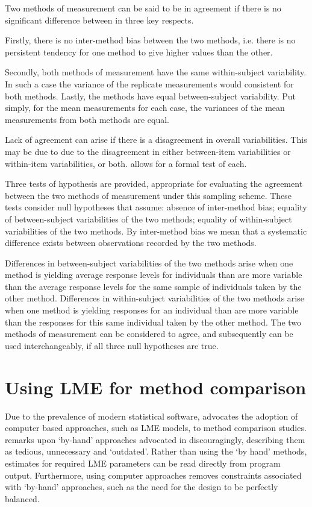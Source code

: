 \documentclass[12pt, a4paper]{report}
\theoremstyle{plain}
\theoremstyle{definition}
\theoremstyle{remark}
\begin{document}
Two methods of measurement can be said to be in agreement if there is no significant difference between in three key respects. 

Firstly, there is no inter-method bias between the two methods, i.e. there is no persistent tendency for one method to give higher values than the other.

Secondly, both methods of measurement have the same  within-subject variability. In such a case the variance of the replicate measurements would consistent for both methods.
Lastly, the methods have equal between-subject variability.  Put simply, for the mean measurements for each case, the variances of the mean measurements from both methods are equal.

Lack of agreement can arise if there is a disagreement in overall variabilities. This may be due to due to the disagreement in either between-item
variabilities or within-item variabilities, or both. \citet{ARoy2009} allows for a formal test of each.

\bigskip

Three tests of hypothesis are provided, appropriate for evaluating the agreement between the two methods of measurement under this sampling scheme. These tests consider null hypotheses that assume: absence of inter-method bias; equality of between-subject variabilities of the two methods; equality of within-subject variabilities of the two methods. By inter-method bias we mean that a systematic difference exists between observations recorded by the two methods. 

Differences in between-subject variabilities of the two methods arise when one method is yielding average response levels for individuals than are more variable than the average response levels for the same sample of individuals taken by the other method.  Differences in within-subject variabilities of the two methods arise when one method is yielding responses for an individual than are more variable than the responses for this same individual taken by the other method. The two methods of measurement can be considered to agree, and subsequently can be used interchangeably, if all three null hypotheses are true.	


\section{Using LME for method comparison}
Due to the prevalence of modern statistical software, \citet{BXC2008} advocates the adoption of computer based approaches, such as LME models, to method comparison studies. \citet{BXC2008} remarks upon `by-hand' approaches advocated in \citet{BA99} discouragingly, describing them as tedious, unnecessary and `outdated'. Rather than using the `by hand' methods, estimates for required LME parameters can be read directly from program output. Furthermore, using computer approaches removes constraints associated with `by-hand' approaches, such as the need for the design to be perfectly balanced.
\end{document}
